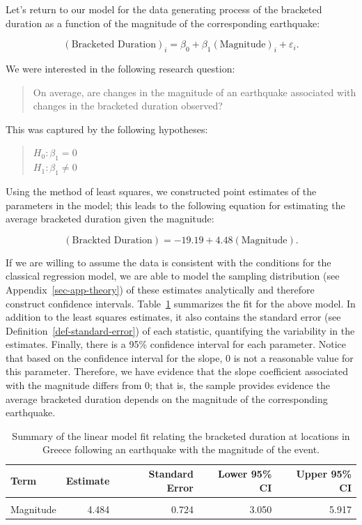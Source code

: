 \documentclass[
  letterpaper,
  DIV=11,
  numbers=noendperiod]{scrreprt}
\theoremstyle{definition}
\theoremstyle{definition}
\theoremstyle{plain}
\theoremstyle{remark}
\begin{document}
Let's return to our model for the data generating process of the
bracketed duration as a function of the magnitude of the corresponding
earthquake:

\[(\text{Bracketed Duration})_i = \beta_0 + \beta_1(\text{Magnitude})_i + \varepsilon_i.\]

We were interested in the following research question:

\begin{quote}
On average, are changes in the magnitude of an earthquake associated
with changes in the bracketed duration observed?
\end{quote}

This was captured by the following hypotheses:

\begin{quote}
\(H_0: \beta_1 = 0\)\\
\(H_1: \beta_1 \neq 0\)
\end{quote}

Using the method of least squares, we constructed point estimates of the
parameters in the model; this leads to the following equation for
estimating the average bracketed duration given the magnitude:

\[(\text{Brackted Duration}) = -19.19 + 4.48(\text{Magnitude}).\]

If we are willing to assume the data is consistent with the conditions
for the classical regression model, we are able to model the sampling
distribution (see Appendix~\ref{sec-app-theory}) of these estimates
analytically and therefore construct confidence intervals.
Table~\ref{tbl-regconditions-slr-summary} summarizes the fit for the
above model. In addition to the least squares estimates, it also
contains the standard error (see Definition~\ref{def-standard-error}) of
each statistic, quantifying the variability in the estimates. Finally,
there is a 95\% confidence interval for each parameter. Notice that
based on the confidence interval for the slope, 0 is not a reasonable
value for this parameter. Therefore, we have evidence that the slope
coefficient associated with the magnitude differs from 0; that is, the
sample provides evidence the average bracketed duration depends on the
magnitude of the corresponding earthquake.

\hypertarget{tbl-regconditions-slr-summary}{}
\begin{table}
\caption{\label{tbl-regconditions-slr-summary}Summary of the linear model fit relating the bracketed duration at
locations in Greece following an earthquake with the magnitude of the
event. }\tabularnewline

\centering
\begin{tabular}[t]{lrrrr}
\toprule
Term & Estimate & Standard Error & Lower 95\% CI & Upper 95\% CI\\
\midrule
\cellcolor{gray!6}{(Intercept)} & \cellcolor{gray!6}{-19.194} & \cellcolor{gray!6}{3.975} & \cellcolor{gray!6}{-27.066} & \cellcolor{gray!6}{-11.323}\\
Magnitude & 4.484 & 0.724 & 3.050 & 5.917\\
\bottomrule
\end{tabular}
\end{table}
\end{document}
